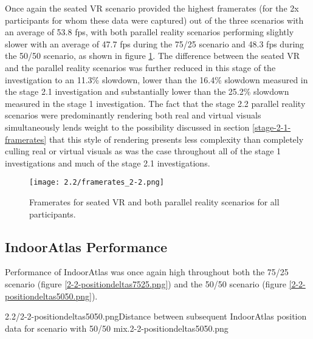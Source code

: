 Once again the seated VR scenario provided the highest framerates (for the 2x participants for whom these data were captured) out of the three scenarios with an average of 53.8 fps, with both parallel reality scenarios performing slightly slower with an average of 47.7 fps during the 75/25 scenario and 48.3 fps during the 50/50 scenario, as shown in figure \ref{framerates_2-2.png}. The difference between the seated VR and the parallel reality scenarios was further reduced in this stage of the investigation to an 11.3\% slowdown, lower than the 16.4\% slowdown measured in the stage 2.1 investigation and substantially lower than the 25.2\% slowdown measured in the stage 1 investigation. The fact that the stage 2.2 parallel reality scenarios were predominantly rendering both real and virtual visuals simultaneously lends weight to the possibility discussed in section \ref{stage-2-1-framerates} that this style of rendering presents less complexity than completely culling real or virtual visuals as was the case throughout all of the stage 1 investigations and much of the stage 2.1 investigations.

\begin{figure}[h]
	\begin{center}
	\texttt{[image: 2.2/framerates\_2-2.png]}
	\caption{Framerates for seated VR and both parallel reality scenarios for all participants.}
	\label{framerates_2-2.png}
	\end{center}
\end{figure}


\subsection{IndoorAtlas Performance}

Performance of IndoorAtlas was once again high throughout both the 75/25 scenario (figure \ref{2-2-positiondeltas7525.png}) and the 50/50 scenario (figure \ref{2-2-positiondeltas5050.png}).

       {2.2/2-2-positiondeltas5050.png}{Distance between subsequent IndoorAtlas position data for scenario with 50/50 mix.}{2-2-positiondeltas5050.png}


